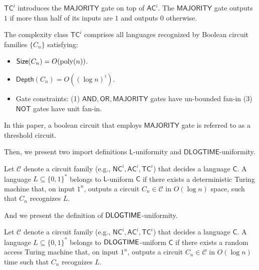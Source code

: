 $\mathsf{TC}^i$ introduces the $\mathsf{MAJORITY}$ gate on top of $\mathsf{AC}^i$. The $\mathsf{MAJORITY}$ gate outputs $1$ if more than half of its inputs are $1$ and outputs $0$ otherwise.

\begin{definition}\label{def:tc}
    The complexity class $\mathsf{TC}^i$ comprises all languages recognized by Boolean circuit families $\{C_n\}$ satisfying:
    \begin{itemize}
        \item $\mathsf{Size}(C_n) = O(\operatorname{poly}(n))$.
        \item $\mathsf{Depth}(C_n) = O((\log n)^i)$.
        \item Gate constraints: (1) $\mathsf{AND}, \mathsf{OR}, \mathsf{MAJORITY}$ gates have un-bounded fan-in (3) $\mathsf{NOT}$ gates have unit fan-in.  
    \end{itemize}
\end{definition}
In this paper, a boolean circuit that employs $\mathsf{MAJORITY}$ gate is referred to as a threshold circuit.

Then, we present two import definitions $\mathsf{L}$-uniformity and $\mathsf{DLOGTIME}$-uniformity.
\begin{definition}
    Let $\mathcal{C}$ denote a circuit family (e.g., $\mathsf{NC}^i,\mathsf{AC}^i,\mathsf{TC}^i$) that decides a language $\mathsf{C}$. A language $L \subseteq \{0,1\}^*$ belongs to $\mathsf{L}$-uniform $\mathsf{C}$ if there exists a deterministic Turing machine that, on input ${1}^n$, outputs a circuit $C_n \in \mathcal{C}$ in $O(\log n)$ space, such that $C_n$ recognizes $L$.
\end{definition}
And we present the definition of $\mathsf{DLOGTIME}$-uniformity.
\begin{definition}
    Let $\mathcal{C}$ denote a circuit family (e.g., $\mathsf{NC}^i,\mathsf{AC}^i,\mathsf{TC}^i$) that decides a language $\mathsf{C}$. A language $L \subseteq \{0,1\}^*$ belongs to $\mathsf{DLOGTIME}$-uniform $\mathsf{C}$ if there exists a random access Turing machine that, on input ${1}^n$, outputs a circuit $C_n \in  \mathcal{C}$ in $O(\log n)$ time such that $C_n$ recognizes $L$.   
\end{definition}



